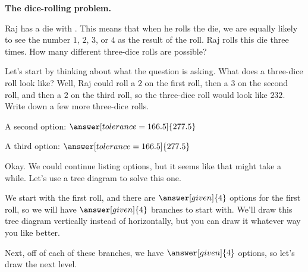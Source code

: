 \documentclass{ximera}
\begin{document}
\begin{question} {\bf The dice-rolling problem.}

Raj has a die with . This means that when he rolls the die, we are equally likely to see the number $1$, $2$, $3$, or $4$ as the result of the roll. Raj rolls this die three times. How many different three-dice rolls are possible?

\begin{explanation}
Let's start by thinking about what the question is asking. What does a three-dice roll look like? Well, Raj could roll a $2$ on the first roll, then a $3$ on the second roll, and then a $2$ on the third roll, so the three-dice roll would look like $232$. Write down a few more three-dice rolls.

\begin{prompt}
A second option: $\answer[tolerance=166.5]{277.5}$

A third option:  $\answer[tolerance=166.5]{277.5}$
\end{prompt}
Okay. We could continue listing options, but it seems like that might take a while. Let's use a tree diagram to solve this one. 

We start with the first roll, and there are $\answer[given]{4}$ options for the first roll, so we will have $\answer[given]{4}$ branches to start with. We'll draw this tree diagram vertically instead of horizontally, but you can draw it whatever way you like better.
\begin{image}
\end{image}
Next, off of each of these branches, we have $\answer[given]{4}$ options, so let's draw the next level.
\begin{image}
\end{image}
\end{explanation}
\end{question}
\end{document}

